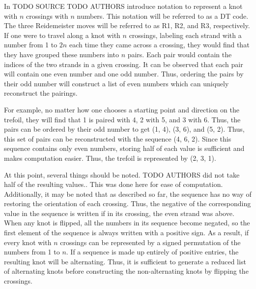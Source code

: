 \begin{paper}
In TODO SOURCE TODO AUTHORS introduce notation to represent a knot with $n$
crossings with $n$ numbers.
This notation will be referred to as a DT code.
The three Reidemeister moves will be referred to as R1, R2, and R3,
respectively.
If one were to travel along a knot with $n$ crossings, labeling each strand with
a number from 1 to $2n$ each time they came across a crossing, they would find
that they have grouped these numbers into $n$ pairs.
Each pair would contain the indices of the two strands in a given crossing.
It can be observed that each pair will contain one even number and one odd
number.
Thus, ordering the pairs by their odd number will construct a list of even
numbers which can uniquely reconstruct the pairings.

For example, no matter how one chooses a starting point and direction on the
trefoil, they will find that 1 is paired with 4, 2 with 5, and 3 with 6.
Thus, the pairs can be ordered by their odd number to get (1, 4), (3, 6), and
(5, 2).
Thus, this set of pairs can be reconstructed with the sequence (4, 6, 2).
Since this sequence contains only even numbers, storing half of each value is
sufficient and makes computation easier.
Thus, the trefoil is represented by (2, 3, 1).

At this point, several things should be noted.
TODO AUTHORS did not take half of the resulting values..
This was done here for ease of computation.
Additionally, it may be noted that as described so far, the sequence has no way
of restoring the orientation of each crossing.
Thus, the negative of the corresponding value in the sequence is written if in
its crossing, the even strand was above.
When any knot is flipped, all the numbers in its sequence become negated, so
the first element of the sequence is always written with a positive sign.
As a result, if every knot with $n$ crossings can be represented by a signed
permutation of the numbers from 1 to $n$.
If a sequence is made up entirely of positive entries, the resulting knot will
be alternating.
Thus, it is sufficient to generate a reduced list of alternating knots before
constructing the non-alternating knots by flipping the crossings.


\end{paper}
